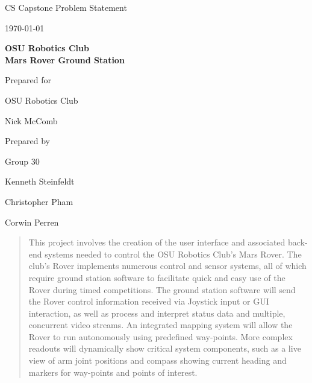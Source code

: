 \documentclass[onecolumn, draftclsnofoot, 10pt, compsoc]{IEEEtran}
\def \CapstoneTeamName{			}
\def \CapstoneTeamNumber{		30}
\def \GroupMemberOne{			Kenneth Steinfeldt}
\def \GroupMemberTwo{			Christopher Pham}
\def \GroupMemberThree{			Corwin Perren}
\def \CapstoneProjectName{		OSU Robotics Club\\Mars Rover Ground Station}
\def \CapstoneSponsorCompany{	OSU Robotics Club}
\def \CapstoneSponsorPerson{	Nick McComb}
\def \DocType{	Problem Statement
			 }
\newcommand{\NameSigPair}[1]{
  \par
  \makebox[2.75in][r]{#1} 
  \hfill
  \makebox[3.25in]{
      \makebox[2.25in]{\hrulefill} 
      \hfill
      \makebox[.75in]{\hrulefill}
  }
  \par\vspace{-12pt} 
  \textit{
      \tiny\noindent
      \makebox[2.75in]{} 
      \hfill
      \makebox[3.25in]{
          \makebox[2.25in][r]{Signature} 
          \hfill
          \makebox[.75in][r]{Date}
      }
  }
}
\renewcommand{\NameSigPair}[1]{#1}
\begin{document}
\begin{titlepage}
\begin{singlespace}
		\par\vspace{.35in}
		\centering
		\scshape{
			\huge CS Capstone \DocType \par
			{\large\today}\par
			\vspace{.5in}
			\textbf{\Huge\CapstoneProjectName}\par
			\vfill
			{\large Prepared for}\par
			\Huge \CapstoneSponsorCompany\par
			\vspace{5pt}
			{\Large\NameSigPair{\CapstoneSponsorPerson}\par}
			{\large Prepared by }\par
			Group\CapstoneTeamNumber\par
			\vspace{5pt}
			{\Large
				\NameSigPair{\GroupMemberOne}\par
				\NameSigPair{\GroupMemberTwo}\par
				\NameSigPair{\GroupMemberThree}\par
			}
			\vspace{20pt}
		}
		\begin{abstract}
            This project involves the creation of the user interface and associated back-end systems needed to control the OSU Robotics Club's Mars Rover.
            The club's Rover implements numerous control and sensor systems, all of which require ground station software to facilitate quick and easy use of the 
            Rover during timed competitions.
            The ground station software will send the Rover control information received via Joystick input or GUI interaction, as well as process and interpret
            status data and multiple, concurrent video streams. 
            An integrated mapping system will allow the Rover to run autonomously using predefined way-points. 
            More complex readouts will dynamically show critical system components, such as a live view of arm joint positions and compass showing current 
            heading and markers for way-points and points of interest. 
		\end{abstract}
	\end{singlespace}
\end{titlepage}
\newpage
{}
\tableofcontents
\clearpage
\end{document}
